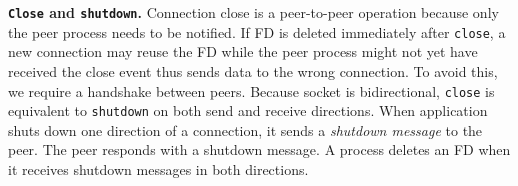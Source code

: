 
\textbf{\texttt{Close} and \texttt{shutdown}.}
Connection close is a peer-to-peer operation because only the peer process needs to be notified. If FD is deleted immediately after \texttt{close}, a new connection may reuse the FD while the peer process might not yet have received the close event thus sends data to the wrong connection. To avoid this, we require a handshake between peers.
Because socket is bidirectional, \texttt{close} is equivalent to \texttt{shutdown} on both send and receive directions.
When application shuts down one direction of a connection, it sends a \textit{shutdown message} to the peer. The peer responds with a shutdown message. A process deletes an FD when it receives shutdown messages in both directions.



\fi
